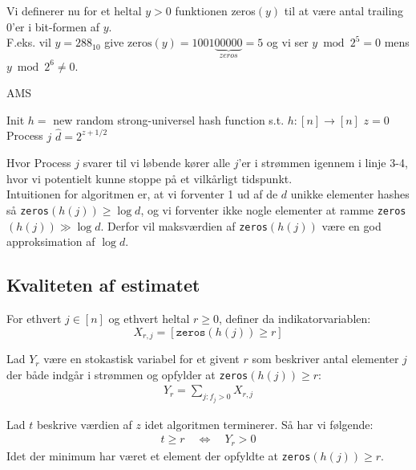 Vi definerer nu for et heltal $y > 0$ funktionen zeros$(y)$ til at være antal trailing 0'er i bit-formen af $y$.\\

F.eks. vil $y = 288_{10}$ give $\text{zeros}(y) = 1001 \underbrace{00000}_{zeros} = 5$ og vi ser $y \bmod 2^5 = 0$ mens $y \bmod 2^6 \neq 0$.\\


\begin{algorithm}[H] \caption{AMS} \label{alg:ams}
  \nonl Init\;
  $h =$ new random strong-universel hash function s.t. $h : [n] \rightarrow [n]$\;
  $z = 0$\;
  \nonl Process $j$\;
  \Return $\hat d = 2^{z + 1/2}$
\end{algorithm}\vspace{1em}

Hvor Process $j$ svarer til vi løbende kører alle $j$'er i strømmen igennem i linje 3-4, hvor vi potentielt kunne stoppe på et vilkårligt tidspunkt.\\

Intuitionen for algoritmen er, at vi forventer 1 ud af de $d$ unikke elementer hashes så \texttt{zeros}$(h(j)) \geq \log d$, og vi forventer ikke nogle elementer at ramme \texttt{zeros}$(h(j)) \gg \log d$. Derfor vil maksværdien af \texttt{zeros}$(h(j))$ være en god approksimation af $\log d$.


\subsection{Kvaliteten af estimatet}

For ethvert $j \in [n]$ og ethvert heltal $r \geq 0$, definer da indikatorvariablen:\\
$$
  X_{r,j} = [\mathtt{zeros}(h(j)) \geq r]
$$

Lad $Y_r$ være en stokastisk variabel for et givent $r$ som beskriver antal elementer $j$ der både indgår i strømmen og opfylder at \texttt{zeros}$(h(j)) \geq r$:
\begin{align}
  Y_r = \sum_{j: f_j > 0} X_{r,j} \label{eq:yr-def}
\end{align}

Lad $t$ beskrive værdien af $z$ idet algoritmen terminerer. Så har vi følgende:
\begin{align}
  t \geq r \quad \Longleftrightarrow \quad Y_r > 0  \label{eq:t-greater-eq-r}
\end{align}
Idet der minimum har været et element der opfyldte at \texttt{zeros}$(h(j)) \geq r$.\\

